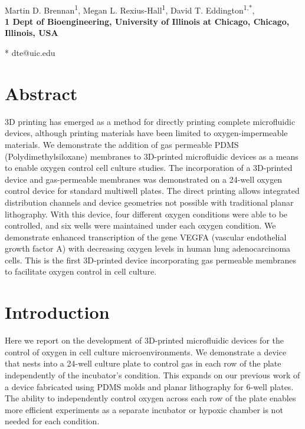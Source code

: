 \documentclass[10pt,letterpaper]{article}
\date{}
\begin{document}
\vspace*{0.35in}

\begin{flushleft}
{\Large
\textbf{}
}
\newline
\\
Martin D. Brennan\textsuperscript{1},
Megan L. Rexius-Hall\textsuperscript{1},
David T. Eddington\textsuperscript{1,*},
\\
\bigskip
\bf{1} Dept of Bioengineering, University of Illinois at Chicago, Chicago, Illinois, USA
\\
\bigskip

* dte@uic.edu

\end{flushleft}
\section*{Abstract}
3D printing has emerged as a method for directly printing complete microfluidic devices, although printing materials have been limited to oxygen-impermeable materials.
We demonstrate the addition of gas permeable PDMS (Polydimethylsiloxane) membranes to 3D-printed microfluidic devices as a means to enable oxygen control cell culture studies.
The incorporation of a 3D-printed device and gas-permeable membranes was demonstrated on a 24-well oxygen control device for standard multiwell plates.
The direct printing allows integrated distribution channels and device geometries not possible with traditional planar lithography.
With this device, four different oxygen conditions were able to be controlled, and six wells were maintained under each oxygen condition. 
We demonstrate enhanced transcription of the gene VEGFA (vascular endothelial growth factor A) with decreasing oxygen levels in human lung adenocarcinoma cells.
This is the first 3D-printed device incorporating gas permeable membranes to facilitate oxygen control in cell culture.
\linenumbers

\section*{Introduction}
Here we report on the development of 3D-printed microfluidic devices for the control of oxygen in cell culture microenvironments.
We demonstrate a device that nests into a 24-well culture plate to control gas in each row of the plate independently of the incubator's condition.
This expands on our previous work of a device fabricated using PDMS molds and planar lithography for 6-well plates\cite{Oppegard2009,Oppegard2010}.
The ability to independently control oxygen across each row of the plate enables more efficient experiments as a separate incubator or hypoxic chamber is not needed for each condition.
\end{document}

